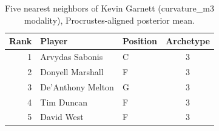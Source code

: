 \begin{table}[htbp]
  \centering\small
  \begin{tabular}{rllc}
    \toprule
    Rank & Player & Position & Archetype \\
    \midrule
    1 & Arvydas Sabonis & C & 3 \\
    2 & Donyell Marshall & F & 3 \\
    3 & De'Anthony Melton & G & 3 \\
    4 & Tim Duncan & F & 3 \\
    5 & David West & F & 3 \\
    \bottomrule
  \end{tabular}
  \caption{Five nearest neighbors of Kevin Garnett (curvature_m3 modality), Procrustes-aligned posterior mean.}
  \label{tab:Kevin_Garnett_neighbors_curvature_m3}
\end{table}

